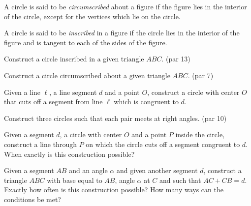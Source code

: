 \begin{definition}\label{defn:circumscribed}
A circle is said to be \emph{circumscribed} about a figure if the figure lies in the interior of the circle, except for the vertices which lie on the circle.
\end{definition}

\begin{definition}A circle is said to be \emph{inscribed} in a figure if the circle lies in the interior of the figure and is tangent to each of the sides of the figure.
\end{definition}

\begin{challenge}\label{chal:triangle-inscribe-circle}
Construct a circle inscribed in a given triangle $ABC$. (par 13)
\end{challenge}

\begin{challenge}\label{chal:triangle-circumscribe-circle}
Construct a circle circumscribed about a given triangle $ABC$. (par 7)
\end{challenge}



\begin{challenge}\label{chal:cut-segment-by-circle}
Given a line $\ell$, a line segment $d$ and a point $O$, construct a circle with center $O$ that cuts off a segment from line $\ell$ which is congruent to $d$.
\end{challenge}



\begin{challenge}\label{chal:three-perp-circles}
Construct three circles such that each pair meets at right angles. (par 10)
\end{challenge}

\begin{challenge}\label{chal:cut-circle-by-segment}
Given a segment $d$, a circle with center $O$ and a point $P$ inside the circle, construct a line through $P$ on which the circle cuts off a segment congruent to $d$.
When exactly is this construction possible?
\end{challenge}


\begin{challenge}\label{chal:triangle-problem}
Given a segment $AB$ and an angle $\alpha$ and given another segment $d$, construct a triangle $ABC$ with base equal to $AB$, angle $\alpha$ at $C$ and such that $AC + CB = d$.
Exactly how often is this construction possible? How many ways can the conditions be met?
\end{challenge}



